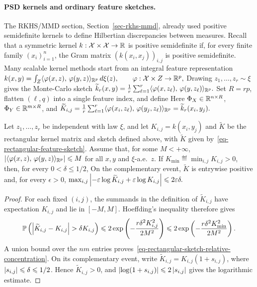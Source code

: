 \paragraph{PSD kernels and ordinary feature sketches.}
The RKHS/MMD section, Section~\ref{sec-rkhs-mmd}, already used positive semidefinite kernels to define Hilbertian discrepancies between measures. Recall that a symmetric kernel \(k:\mathcal{X}\times\mathcal{X}\to\mathbb{R}\) is positive semidefinite if, for every finite family \((x_i)_{i=1}^n\), the Gram matrix \((k(x_i,x_j))_{i,j}\) is positive semidefinite. Many scalable kernel methods start from an integral feature representation
\(k(x,y)=\int_Z \langle \varphi(x,z),\,\varphi(y,z)\rangle_{\mathbb{R}^p}\,d\xi(z), \qquad \varphi:\mathcal{X}\times Z\to\mathbb{R}^p,\)
Drawing \(z_1,\ldots,z_r\sim\xi\) gives the Monte-Carlo sketch
\(\widetilde k_r(x,y) = \frac1r\sum_{\ell=1}^r \langle \varphi(x,z_\ell),\,\varphi(y,z_\ell)\rangle_{\mathbb{R}^p}.\)
Set \(R=rp\), flatten \((\ell,q)\) into a single feature index, and define
Here \(\Phi_X\in\mathbb{R}^{n\times R}\), \(\Phi_Y\in\mathbb{R}^{m\times R}\), and
\(\widetilde K_{i,j} = \frac1r\sum_{\ell=1}^r \langle \varphi(x_i,z_\ell),\,\varphi(y_j,z_\ell)\rangle_{\mathbb{R}^p} = \widetilde k_r(x_i,y_j).\)
\begin{prop}
\label{prop-sinkhorn-sketch-positive-guarantee}
Let \(z_1,\ldots,z_r\) be independent with law \(\xi\), and let \(K_{i,j}=k(x_i,y_j)\) and \(\widetilde K\) be the rectangular kernel matrix and sketch defined above, with \(\widetilde K\) given by~\eqref{eq-rectangular-feature-sketch}. Assume that, for some \(M<+\infty\),
$\left\lvert\langle \varphi(x,z),\,\varphi(y,z)\rangle_{\mathbb{R}^p}\right\rvert\leqslant M$ for all $x,y$ and $\xi$-a.e.\ $z$.
If \(K_{\min}\eqdef\min_{i,j}K_{i,j}>0\), then, for every \(0<\delta\leq1/2\),
On the complementary event, \(\widetilde K\) is entrywise positive and, for every \(\epsilon>0\), \(\max_{i,j} \left\lvert-\varepsilon\log\widetilde K_{i,j}+\varepsilon\log K_{i,j}\right\rvert \leqslant 2\varepsilon\delta.\)
\end{prop}
\begin{proof}
For each fixed \((i,j)\), the summands in the definition of \(\widetilde K_{i,j}\) have expectation \(K_{i,j}\) and lie in \([-M,M]\). Hoeffding's inequality therefore gives
\[
\mathbb{P}\left( 
\left\lvert\widetilde K_{i,j}-K_{i,j}\right\rvert>\delta K_{i,j}
 \right)
\leqslant
2\exp\left( -\frac{r\delta^2K_{i,j}^2}{2M^2} \right)
\leqslant
2\exp\left( -\frac{r\delta^2K_{\min}^2}{2M^2} \right).
\]
A union bound over the \(nm\) entries proves~\eqref{eq-rectangular-sketch-relative-concentration}. On its complementary event, write \(\widetilde K_{i,j}=K_{i,j}(1+s_{i,j})\), where \(\left\lvert s_{i,j}\right\rvert\leqslant\delta\leqslant1/2\). Hence \(\widetilde K_{i,j}>0\), and \(\left\lvert\log(1+s_{i,j})\right\rvert\leqslant2\left\lvert s_{i,j}\right\rvert\) gives the logarithmic estimate.
\end{proof}
